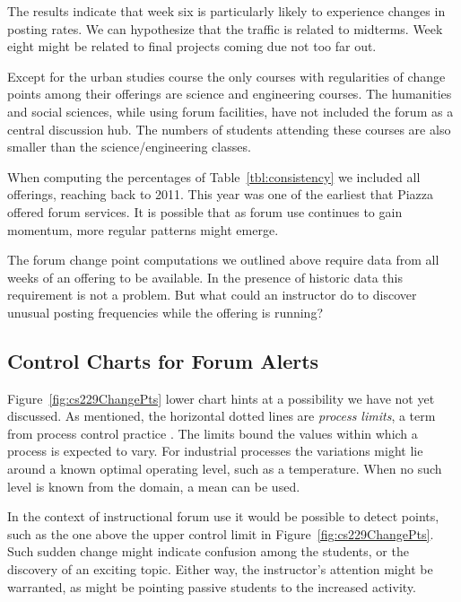 The results indicate that week six is particularly likely to
experience changes in posting rates. We can hypothesize that the
traffic is related to midterms. Week eight might be related to final
projects coming due not too far out.

Except for the urban studies course the only courses with regularities
of change points among their offerings are science and engineering
courses. The humanities and social sciences, while using forum
facilities, have not included the forum as a central discussion
hub. The numbers of students attending these courses are also
smaller than the science/engineering classes.

When computing the percentages of Table~\ref{tbl:consistency} we
included all offerings, reaching back to 2011. This year was one of
the earliest that Piazza offered forum services. It is possible that
as forum use continues to gain momentum, more regular patterns might
emerge.

The forum change point computations we outlined above require data
from all weeks of an offering to be available. In the presence of
historic data this requirement is not a problem. But what could an
instructor do to discover unusual posting frequencies while the
offering is running?

\subsection{Control Charts for Forum Alerts}
Figure~\ref{fig:cs229ChangePts} lower chart hints at a possibility we
have not yet discussed. As mentioned, the horizontal dotted lines are
{\em process limits}, a term from process control practice
\cite{nist2012}. The limits bound the values within which a process is
expected to vary. For industrial processes the variations might lie
around a known optimal operating level, such as a temperature. When no
such level is known from the domain, a mean can be used.

In the context of instructional forum use it would be possible to
detect points, such as the one above the upper control limit in
Figure~\ref{fig:cs229ChangePts}. Such sudden change might indicate
confusion among the students, or the discovery of an exciting
topic. Either way, the instructor's attention might be warranted, as
might be pointing passive students to the increased activity.

